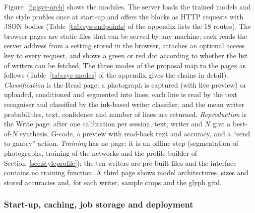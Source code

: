 Figure~\ref{fig:sys-arch} shows the modules.
The server loads the trained models and the style profiles once at start-up and offers the blocks as HTTP requests with JSON bodies (Table~\ref{tab:sys-endpoints} of the appendix lists the 18 routes).
The browser pages are static files that can be served by any machine; each reads the server address from a setting stored in the browser, attaches an optional access key to every request, and shows a green or red dot according to whether the list of writers can be fetched.
The three modes of the proposal map to the pages as follows (Table~\ref{tab:sys-modes} of the appendix gives the chains in detail).
\emph{Classification} is the Read page: a photograph is captured (with live preview) or uploaded, conditioned and segmented into lines, each line is read by the text recogniser and classified by the ink-based writer classifier, and the mean writer probabilities, text, confidence and number of lines are returned.
\emph{Reproduction} is the Write page: after one calibration per session, text, writer and $N$ give a best-of-$N$ synthesis, G-code, a preview with read-back text and accuracy, and a ``send to gantry'' action.
\emph{Training} has no page: it is an offline step (segmentation of photographs, training of the networks and the profile builder of Section~\ref{sec:styleprofile}); the ten writers are pre-built files and the interface contains no training function.
A third page shows model architectures, sizes and stored accuracies and, for each writer, sample crops and the glyph grid.

\subsubsection{Start-up, caching, job storage and deployment}

